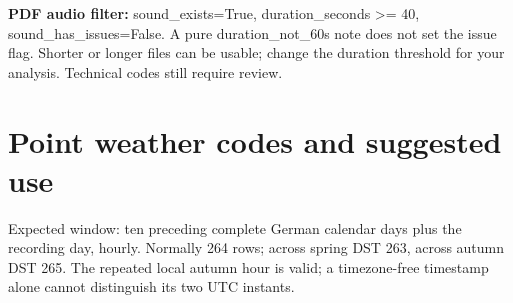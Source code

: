\documentclass[a4paper,9pt]{extarticle}
\begin{document}
\textbf{PDF audio filter:} sound\_exists=True, duration\_seconds \textgreater{}= 40, sound\_has\_issues=False. A pure duration\_not\_60s note does not set the issue flag. Shorter or longer files can be usable; change the duration threshold for your analysis. Technical codes still require review.\par

\section*{Point weather codes and suggested use}

Expected window: ten preceding complete German calendar days plus the recording day, hourly. Normally 264 rows; across spring DST 263, across autumn DST 265. The repeated local autumn hour is valid; a timezone-free timestamp alone cannot distinguish its two UTC instants.\par
\end{document}
